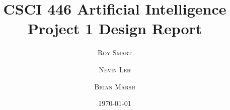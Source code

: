 \documentclass{article}
\title{\vspace{-15mm}\fontsize{24pt}{10pt}\selectfont\textbf{CSCI 446 Artificial Intelligence \\ Project 1 Design Report} \\[-2mm]} %
\date{\today}
\author{
\large
\textsc{Roy Smart} \and \textsc{Nevin Leh} \and \textsc{Brian Marsh}\\[2mm] %
}
\begin{document}
\maketitle %

\thispagestyle{fancy} %



\begin{multicols}{2} %
\normalsize

\end{multicols}
\end{document}
